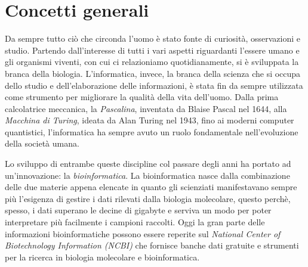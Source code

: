 \chapter{Concetti generali}\label{chapter:cap_one}
Da sempre tutto ciò che circonda l'uomo è stato fonte di curiosità, osservazioni e studio.
Partendo dall'interesse di tutti i vari aspetti riguardanti l'essere umano e gli organismi viventi,
con cui ci relazioniamo quotidianamente, si è sviluppata la branca della biologia.
L'informatica, invece, la branca della scienza che si occupa dello studio e dell'elaborazione delle informazioni,
è stata fin da sempre utilizzata come strumento per migliorare la qualità della vita dell'uomo\cite{treccaniInformatica}.
Dalla prima calcolatrice meccanica, la \textit{Pascalina}, inventata da Blaise Pascal nel 1644\cite{pascal1995pensieri}, 
alla \textit{Macchina di Turing}, ideata da Alan Turing nel 1943\cite{singh1999codici}, 
fino ai moderni computer quantistici, l'informatica ha sempre avuto un ruolo fondamentale nell'evoluzione della società umana.

Lo sviluppo di entrambe queste discipline col passare degli anni ha portato ad un'innovazione: la \textit{bioinformatica}.
La bioinformatica nasce dalla combinazione delle due materie appena elencate in quanto gli scienziati manifestavano
sempre più l'esigenza di gestire i dati rilevati dalla biologia
molecolare, questo perchè, spesso, i dati superano le decine di gigabyte e serviva un modo per poter interpretare più facilmente i campioni raccolti.
Oggi la gran parte delle informazioni bioinformatiche possono essere reperite sul \textit{National
Center of Biotechnology Information (NCBI)} che fornisce banche dati gratuite e strumenti per la ricerca in biologia molecolare e bioinformatica\cite{ncbi}.
